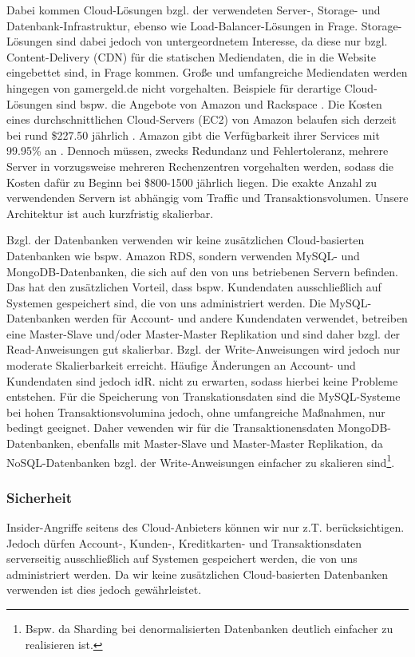 Dabei kommen Cloud-Lösungen bzgl. der verwendeten Server-, Storage- und
Datenbank-Infrastruktur, ebenso wie Load-Balancer-Lösungen in Frage.
Storage-Lösungen sind dabei jedoch von untergeordnetem Interesse, da diese nur
bzgl. Content-Delivery (CDN) für die statischen Mediendaten, die in die Website
eingebettet sind, in Frage kommen. Große und umfangreiche Mediendaten werden
hingegen von gamergeld.de nicht vorgehalten. Beispiele für derartige
Cloud-Lösungen sind bspw. die Angebote von Amazon \cite{Amazon} und Rackspace
\cite{Rackspace}. Die Kosten eines durchschnittlichen Cloud-Servers (EC2) von
Amazon belaufen sich derzeit bei rund \$227.50 jährlich \cite{Amazon}. Amazon
gibt die Verfügbarkeit ihrer Services mit 99.95\% an \cite{Amazon}. Dennoch
müssen, zwecks Redundanz und Fehlertoleranz, mehrere Server in vorzugsweise
mehreren Rechenzentren vorgehalten werden, sodass die Kosten dafür zu Beginn
bei \$800-1500 jährlich liegen. Die exakte Anzahl zu verwendenden Servern ist
abhängig vom Traffic und Transaktionsvolumen. Unsere Architektur ist auch
kurzfristig skalierbar.

Bzgl. der Datenbanken verwenden wir keine zusätzlichen Cloud-basierten
Datenbanken wie bspw. Amazon RDS, sondern verwenden MySQL- und
MongoDB-Datenbanken, die sich auf den von uns betriebenen Servern befinden.
Das hat den zusätzlichen Vorteil, dass bspw. Kundendaten ausschließlich auf
Systemen gespeichert sind, die von uns administriert werden. Die
MySQL-Datenbanken werden für Account- und andere Kundendaten verwendet,
betreiben eine Master-Slave und/oder Master-Master Replikation und sind daher
bzgl. der Read-Anweisungen gut skalierbar. Bzgl. der Write-Anweisungen wird
jedoch nur moderate Skalierbarkeit erreicht. Häufige Änderungen an Account- und
Kundendaten sind jedoch idR. nicht zu erwarten, sodass hierbei keine Probleme
entstehen. Für die Speicherung von Transkationsdaten sind die MySQL-Systeme bei
hohen Transaktionsvolumina jedoch, ohne umfangreiche Maßnahmen, nur bedingt
geeignet. Daher vewenden wir für die Transaktionensdaten MongoDB-Datenbanken,
ebenfalls mit Master-Slave und Master-Master Replikation, da NoSQL-Datenbanken
bzgl. der Write-Anweisungen einfacher zu skalieren sind\footnote{Bspw. da
Sharding bei denormalisierten Datenbanken deutlich einfacher zu realisieren
ist.}.

\subsubsection{Sicherheit}
Insider-Angriffe seitens des Cloud-Anbieters können wir nur z.T.
berücksichtigen. Jedoch dürfen Account-, Kunden-, Kreditkarten- und
Transaktionsdaten serverseitig ausschließlich auf Systemen gespeichert werden,
die von uns administriert werden. Da wir keine zusätzlichen Cloud-basierten
Datenbanken verwenden ist dies jedoch gewährleistet.

